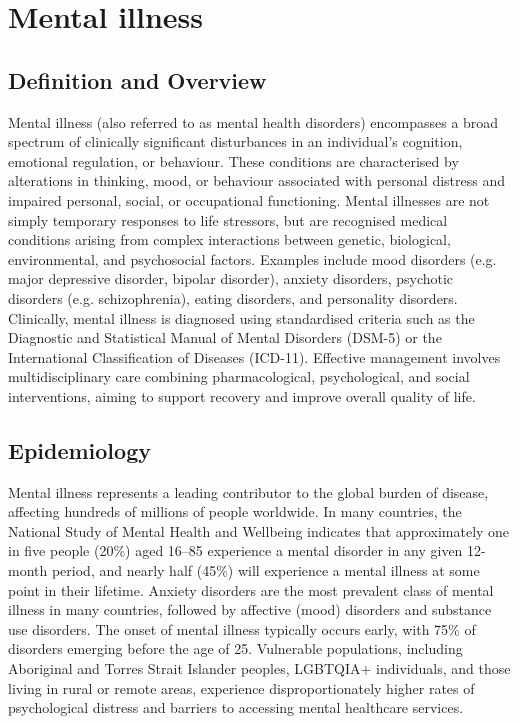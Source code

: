 \chapter{Mental illness}

\section*{Definition and Overview}
Mental illness (also referred to as mental health disorders) encompasses a broad spectrum of clinically significant disturbances in an individual's cognition, emotional regulation, or behaviour. These conditions are characterised by alterations in thinking, mood, or behaviour associated with personal distress and impaired personal, social, or occupational functioning. Mental illnesses are not simply temporary responses to life stressors, but are recognised medical conditions arising from complex interactions between genetic, biological, environmental, and psychosocial factors. Examples include mood disorders (e.g. major depressive disorder, bipolar disorder), anxiety disorders, psychotic disorders (e.g. schizophrenia), eating disorders, and personality disorders. Clinically, mental illness is diagnosed using standardised criteria such as the Diagnostic and Statistical Manual of Mental Disorders (DSM-5) or the International Classification of Diseases (ICD-11). Effective management involves multidisciplinary care combining pharmacological, psychological, and social interventions, aiming to support recovery and improve overall quality of life.

\section*{Epidemiology}
Mental illness represents a leading contributor to the global burden of disease, affecting hundreds of millions of people worldwide. In many countries, the National Study of Mental Health and Wellbeing indicates that approximately one in five people (20\%) aged 16--85 experience a mental disorder in any given 12-month period, and nearly half (45\%) will experience a mental illness at some point in their lifetime. Anxiety disorders are the most prevalent class of mental illness in many countries, followed by affective (mood) disorders and substance use disorders. The onset of mental illness typically occurs early, with 75\% of disorders emerging before the age of 25. Vulnerable populations, including Aboriginal and Torres Strait Islander peoples, LGBTQIA+ individuals, and those living in rural or remote areas, experience disproportionately higher rates of psychological distress and barriers to accessing mental healthcare services.

